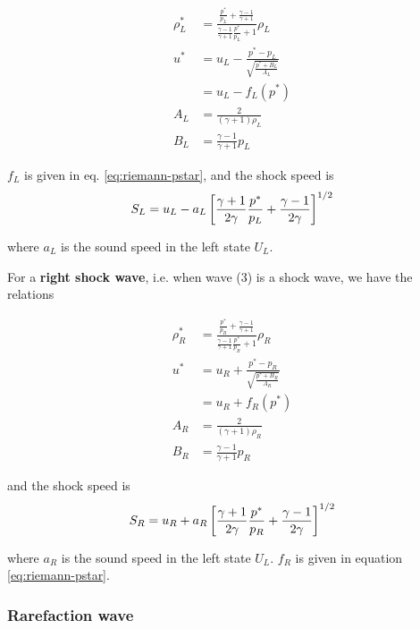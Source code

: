 \begin{align*}
	\rho^*_L &= 
		\frac{\frac{p^*}{p_L} + \frac{\gamma - 1}{\gamma+1}}{\frac{\gamma - 1}{\gamma+1} \frac{p^*}{p_L} + 1} \rho_L \\
	u^* &= 
		u_L - \frac{p^* - p_L}{\sqrt{\frac{p^* + B_L}{A_L}}}\\
		& = u_L - f_L(p^*) \\
	A_L &= 
		\frac{2}{(\gamma + 1) \rho_L}\\
	B_L &= 
		\frac{\gamma - 1}{\gamma + 1} p_L
\end{align*}

$f_{L}$ is given in eq. \ref{eq:riemann-pstar}, and the shock speed is
\begin{align*}
	S_L = u_L - a_L \left[\frac{\gamma + 1}{2 \gamma} \frac{p^*}{p_L} + \frac{\gamma - 1}{2\gamma} \right]^{1/2}
\end{align*}

where $a_L$ is the sound speed in the left state $U_L$.



For a \textbf{right shock wave}, i.e. when wave (3) is a shock wave, we have the relations


\begin{align*}
	\rho^*_R &= 
		\frac{\frac{p^*}{p_R} + \frac{\gamma - 1}{\gamma+1}}{\frac{\gamma - 1}{\gamma+1} \frac{p^*}{p_R} + 1} \rho_R \\
	u^* &= 
		u_R + \frac{p^* - p_R}{\sqrt{\frac{p^* + B_R}{A_R}}}\\
		& = u_R + f_R(p^*) \\
	A_R &= 
		\frac{2}{(\gamma + 1) \rho_R}\\
	B_R &= 
		\frac{\gamma - 1}{\gamma + 1} p_R
\end{align*}

and the shock speed is
\begin{align*}
	S_R = u_R + a_R \left[\frac{\gamma + 1}{2 \gamma} \frac{p^*}{p_R} + \frac{\gamma - 1}{2\gamma} \right]^{1/2}
\end{align*}

where $a_R$ is the sound speed in the left state $U_L$. $f_R$ is given in equation \ref{eq:riemann-pstar}.










\subsubsection{Rarefaction wave}

